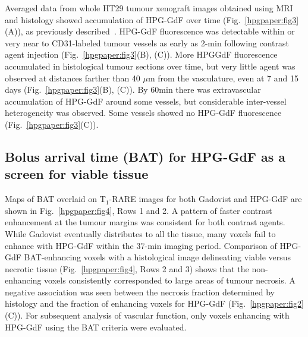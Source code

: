 Averaged data from whole HT29 tumour xenograft images obtained using MRI and histology showed accumulation of HPG-GdF over time (Fig.~\ref{hpgpaper:fig3}(A)), as previously described~\cite{Saatchi:2012hc}.
HPG-GdF fluorescence was detectable within or very near to CD31-labeled tumour vessels as early as 2-min following contrast agent injection (Fig.~\ref{hpgpaper:fig3}(B), (C)).
More HPGGdF fluorescence accumulated in histological tumour sections over time, but very little agent was observed at distances farther than 40 $\mu$m from the vasculature, even at 7 and 15 days (Fig.~\ref{hpgpaper:fig3}(B), (C)).
By 60min there was extravascular accumulation of HPG-GdF around some vessels, but considerable inter-vessel heterogeneity was observed.
Some vessels showed no HPG-GdF fluorescence (Fig.~\ref{hpgpaper:fig3}(C)).

\subsection{Bolus arrival time (BAT) for HPG-GdF as a screen for viable tissue}

Maps of BAT overlaid on T$_1$-RARE images for both Gadovist and HPG-GdF are shown in Fig.~\ref{hpgpaper:fig4}, Rows 1 and 2.
A pattern of faster contrast enhancement at the tumour margins was consistent for both contrast agents.
While Gadovist eventually distributes to all the tissue, many voxels fail to enhance with HPG-GdF within the 37-min imaging period.
Comparison of HPG-GdF BAT-enhancing voxels with a histological image delineating viable versus necrotic tissue (Fig.~\ref{hpgpaper:fig4}, Rows 2 and 3) shows that the non-enhancing voxels consistently corresponded to large areas of tumour necrosis.
A negative association was seen between the necrosis fraction determined by histology and the fraction of enhancing voxels for HPG-GdF (Fig.~\ref{hpgpaper:fig2}(C)).
For subsequent analysis of vascular function, only voxels enhancing with HPG-GdF using the BAT criteria were evaluated.

